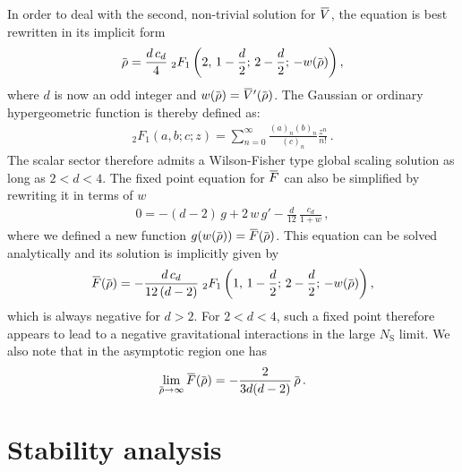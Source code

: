 \documentclass[11pt]{book} %
\newcommand{\overbar}[1]{\mkern 1.5mu\overline{\mkern-1.5mu#1\mkern-1.5mu}\mkern 1.5mu}
\newcommand\NS{ N_{\scriptscriptstyle{\mathrm{S}}} }
\newcommand{\bV}{\overbar V}
\newcommand{\bF}{\overbar F}
\newcommand{\brho}{\overbar \rho}
\numberwithin{equation}{chapter}
\begin{document}
In order to deal with the second, non-trivial solution for $\bV$,
the equation is best rewritten in its implicit form
\begin{align}
  \brho = \frac{d \, c_d}{4} \;
  _2F_1 \left( 2,\, 1 - \frac{d}{2};\, 2 - \frac{d}{2};\, -w(\brho) \right) ,
\end{align}
where $d$ is now an odd integer and $w(\brho)=\bV'(\brho)$.
The Gaussian or ordinary hypergeometric function is thereby defined as:
\begin{align}
  {}_2F_1(a,b;c;z) = \sum_{n=0}^\infty \frac{(a)_n (b)_n}{(c)_n} \frac{z^n}{n!} \,.
\end{align}
The scalar sector therefore admits a Wilson-Fisher type global scaling solution as long as $2<d<4$.
The fixed point equation for $\bF$ can also be simplified by rewriting it in terms of $w$
\begin{align}
  0 = -(d-2) \, g + 2 \, w \, g' - \frac{d}{12} \, \frac{c_d}{1+w} \,,
\end{align}
where we defined a new function $g(w(\brho)) = \bF (\brho)$.
This equation can be solved analytically and its solution is implicitly given by
\begin{align}
  \bF(\brho) = - \frac{d \, c_d}{12 \, (d-2)} \;
  _2F_1\left( 1,\, 1 - \frac{d}{2};\, 2 - \frac{d}{2};\, -w(\brho) \right) ,
\end{align}
which is always negative for $d>2$. For $2<d<4$, such a fixed point therefore appears
to lead to a negative gravitational interactions in the large $\NS$ limit.
We also note that in the asymptotic region one has
\begin{align}
  \lim_{\brho \to \infty} \bF(\brho)= -\frac{ 2 }{ 3 d (d-2) } \, \brho \,.
\end{align}


\section{Stability analysis}
\end{document}
